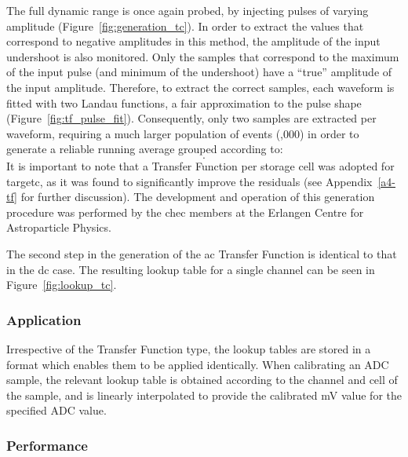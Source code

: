 The full dynamic range is once again probed, by injecting pulses of varying amplitude (Figure~\ref{fig:generation_tc}). In order to extract the values that correspond to negative amplitudes in this method, the amplitude of the input undershoot is also monitored. Only the samples that correspond to the maximum of the input pulse (and minimum of the undershoot) have a ``true'' amplitude of the input amplitude. Therefore, to extract the correct samples, each waveform is fitted with two Landau functions, a fair approximation to the pulse shape (Figure~\ref{fig:tf_pulse_fit}). Consequently, only two samples are extracted per waveform, requiring a much larger population of events (,000) in order to generate a reliable running average grouped according to: 
\begin{equation}
	[Module, Channel, Storage Cell, Input Amplitude].
\end{equation}
It is important to note that a Transfer Function per storage cell was adopted for \gls{targetc}, as it was found to significantly improve the residuals (see Appendix~\ref{a4-tf} for further discussion). The development and operation of this generation procedure was performed by the \gls{chec} members at the Erlangen Centre for Astroparticle Physics.

The second step in the generation of the \gls{ac} Transfer Function is identical to that in the \gls{dc} case. The resulting lookup table for a single channel can be seen in Figure~\ref{fig:lookup_tc}.

\subsubsection{Application}

Irrespective of the Transfer Function type, the lookup tables are stored in a format which enables them to be applied identically. When calibrating an ADC sample, the relevant lookup table is obtained according to the channel and cell of the sample, and is linearly interpolated to provide the calibrated \si{mV} value for the specified ADC value.

\subsubsection{Performance}

